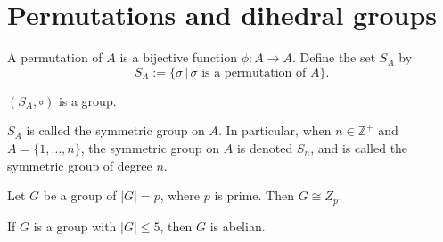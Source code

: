 \documentclass{article}
\begin{document}
\section{Permutations and dihedral groups}
\begin{defi}[Permutation]
	A permutation of \(A\) is a bijective function \(\phi:A\rightarrow A\). Define the set \(S_A\) by
	\begin{equation*}
		S_A:=\{\sigma\,|\,\sigma\text{ is a permutation of }A\}.
	\end{equation*}
\end{defi}
\begin{rema}
	\((S_A,\circ)\) is a group.
\end{rema}
\begin{defi}
	\(S_A\) is called the symmetric group on \(A\). In particular, when \(n\in\mathbb{Z}^{+}\) and \(A=\{1,\ldots,n\}\), the symmetric group on \(A\) is denoted \(S_n\), and is called the symmetric group of degree \(n\).
\end{defi}
\begin{lem}
	Let \(G\) be a group of \(\lvert G\rvert=p\), where \(p\) is prime. Then \(G\cong Z_p\).
\end{lem}
\begin{lem}
	If \(G\) is a group with \(\lvert G\rvert\leq 5\), then \(G\) is abelian.
\end{lem}
\end{document}
